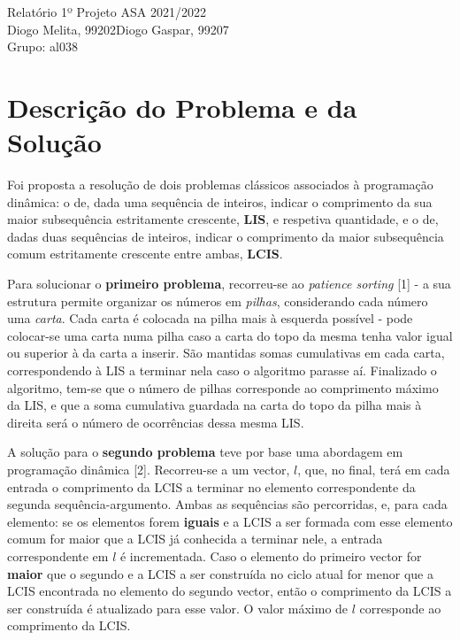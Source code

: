 \documentclass[12pt]{article}
\newcommand{\melita}{Diogo Melita, 99202}
\newcommand{\gaspar}{Diogo Gaspar, 99207}
\newcommand{\grupo}{al038}
\begin{document}
\begin{center}
{\Huge{Relatório 1º Projeto ASA 2021/2022}} \\
\vspace{0.5mm}
{\large{\melita \quad \gaspar}} \\
\vspace{0.5mm}
{\large{Grupo: \grupo}} \\
\end{center}

\section{Descrição do Problema e da Solução}
Foi proposta a resolução de dois problemas clássicos associados à programação dinâmica: o de, dada uma sequência de inteiros, indicar o comprimento da sua maior subsequência estritamente crescente, \textbf{LIS}, e respetiva quantidade, e o de, dadas duas sequências de inteiros, indicar o comprimento da maior subsequência comum estritamente crescente entre ambas, \textbf{LCIS}. 

\vspace{0.5mm}
Para solucionar o \textbf{primeiro problema}, recorreu-se ao \textit{patience sorting} [1] - a sua estrutura permite organizar os números em \textit{pilhas}, considerando cada número uma \textit{carta}. Cada carta é colocada na pilha mais à esquerda possível - pode colocar-se uma carta numa pilha caso a carta do topo da mesma tenha valor igual ou superior à da carta a inserir. São mantidas somas cumulativas em cada carta, correspondendo à LIS a terminar nela caso o algoritmo parasse aí. Finalizado o algoritmo, tem-se que o número de pilhas corresponde ao comprimento máximo da LIS, e que a soma cumulativa guardada na carta do topo da pilha mais à direita será o número de ocorrências dessa mesma LIS.

\vspace{0.5mm}
A solução para o \textbf{segundo problema} teve por base uma abordagem em programação dinâmica [2]. Recorreu-se a um vector, $l$, que, no final, terá em cada entrada o comprimento da LCIS a terminar no elemento correspondente da segunda sequência-argumento. Ambas as sequências são percorridas, e, para cada elemento: se os elementos forem \textbf{iguais} e a LCIS a ser formada com esse elemento comum for maior que a LCIS já conhecida a terminar nele, a entrada correspondente em $l$ é incrementada. Caso o elemento do primeiro vector for \textbf{maior} que o segundo e a LCIS a ser construída no ciclo atual for menor que a LCIS encontrada no elemento do segundo vector, então o comprimento da LCIS a ser construída é atualizado para esse valor. O valor máximo de $l$ corresponde ao comprimento da LCIS.
\end{document}
